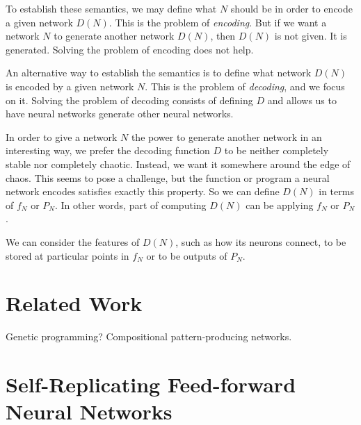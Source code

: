 \documentclass[12pt]{article}
\newcommand{\term}[1]{\emph{#1}}
\begin{document}
To establish these semantics,
we may define what $N$ should be
in order to encode a given network $D(N)$.
This is the problem of \term{encoding}.
But if we want a network $N$
to generate another network $D(N)$,
then $D(N)$ is not given.
It is generated.
Solving the problem of encoding does not help.

An alternative way to establish the semantics
is to define what network $D(N)$ is encoded
by a given network $N$.
This is the problem of \term{decoding},
and we focus on it.
Solving the problem of decoding
consists of defining $D$
and allows us to have neural networks
generate other neural networks.

In order to give a network $N$
the power to generate another network
in an interesting way,
we prefer the decoding function $D$
to be neither completely stable
nor completely chaotic.
Instead, we want it somewhere around the edge of chaos.%
\cite{langton1990edgechaos}
This seems to pose a challenge,
but the function or program a neural network encodes
satisfies exactly this property.
So we can define $D(N)$ in terms of $f_N$ or $P_N$.
In other words, part of computing $D(N)$
can be applying $f_N$ or $P_N$.

We can consider the features of $D(N)$,
such as how its neurons connect,
to be stored at particular points
in $f_N$
or to be outputs of $P_N$.

\section{Related Work}

Genetic programming?
Compositional pattern-producing networks.



\section{Self-Replicating Feed-forward Neural Networks}
\label{feedforward}
\end{document}
